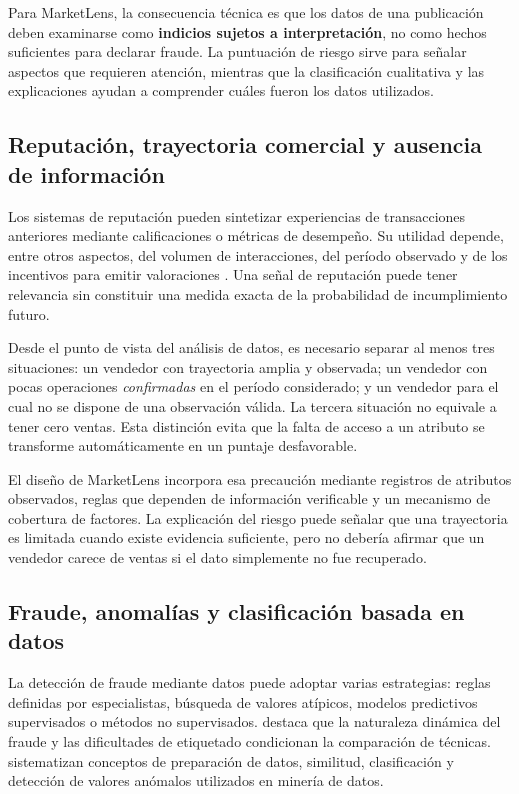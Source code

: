 Para MarketLens, la consecuencia técnica es que los datos de una publicación deben examinarse como \textbf{indicios sujetos a interpretación}, no como hechos suficientes para declarar fraude. La puntuación de riesgo sirve para señalar aspectos que requieren atención, mientras que la clasificación cualitativa y las explicaciones ayudan a comprender cuáles fueron los datos utilizados.

\subsection{Reputación, trayectoria comercial y ausencia de información}\label{subsec:ml-fundamento-reputacion}

Los sistemas de reputación pueden sintetizar experiencias de transacciones anteriores mediante calificaciones o métricas de desempeño. Su utilidad depende, entre otros aspectos, del volumen de interacciones, del período observado y de los incentivos para emitir valoraciones \parencite{ml-resnick-2006,ml-tadelis-2016}. Una señal de reputación puede tener relevancia sin constituir una medida exacta de la probabilidad de incumplimiento futuro.

Desde el punto de vista del análisis de datos, es necesario separar al menos tres situaciones: un vendedor con trayectoria amplia y observada; un vendedor con pocas operaciones \emph{confirmadas} en el período considerado; y un vendedor para el cual no se dispone de una observación válida. La tercera situación no equivale a tener cero ventas. Esta distinción evita que la falta de acceso a un atributo se transforme automáticamente en un puntaje desfavorable.

El diseño de MarketLens incorpora esa precaución mediante registros de atributos observados, reglas que dependen de información verificable y un mecanismo de cobertura de factores. La explicación del riesgo puede señalar que una trayectoria es limitada cuando existe evidencia suficiente, pero no debería afirmar que un vendedor carece de ventas si el dato simplemente no fue recuperado.

\subsection{Fraude, anomalías y clasificación basada en datos}\label{subsec:ml-fundamento-fraude}

La detección de fraude mediante datos puede adoptar varias estrategias: reglas definidas por especialistas, búsqueda de valores atípicos, modelos predictivos supervisados o métodos no supervisados. \textcite{ml-phua-2010} destaca que la naturaleza dinámica del fraude y las dificultades de etiquetado condicionan la comparación de técnicas. \textcite{ml-han-2011} sistematizan conceptos de preparación de datos, similitud, clasificación y detección de valores anómalos utilizados en minería de datos.

